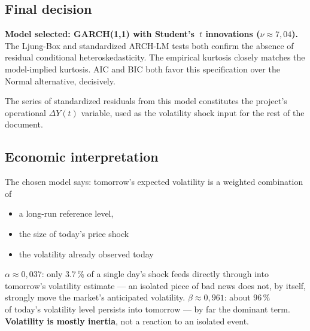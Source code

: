 \documentclass[12pt,a4paper]{article}
\begin{document}
\subsection{Final decision}

\textbf{Model selected: GARCH(1,1) with Student's~$t$ innovations
	($\nu \approx 7{,}04$).} The Ljung-Box and standardized
ARCH-LM tests both confirm the absence of residual conditional
heteroskedasticity. The empirical kurtosis closely matches
the model-implied kurtosis. AIC and BIC both favor this
specification over the Normal alternative, decisively.

The series of standardized residuals from this model constitutes the project's
operational $\Delta Y(t)$ variable, used as the volatility shock
input for the rest of the document.

\newpage

\subsection{Economic interpretation}

\begin{econbox}
	
	The chosen model says: tomorrow's expected volatility is a
	weighted combination of 
	
	\begin{itemize}
		\item a long-run reference level,
		\item the size of today's price shock
		\item the volatility already observed today
	\end{itemize}
	
	\textbf{$\alpha \approx 0{,}037$}:
	only 3.7\,\% of a single day's shock feeds directly through
	into tomorrow's volatility estimate --- an isolated piece of bad news
	does not, by itself, strongly move the market's anticipated
	volatility. \textbf{$\beta \approx 0{,}961$}: about 96\,\% \\of
	today's volatility level persists into tomorrow --- by far the
	dominant term. \textbf{Volatility is mostly inertia}, not a
	reaction to an isolated event.
\end{econbox}

\vspace{2cm}
\end{document}
